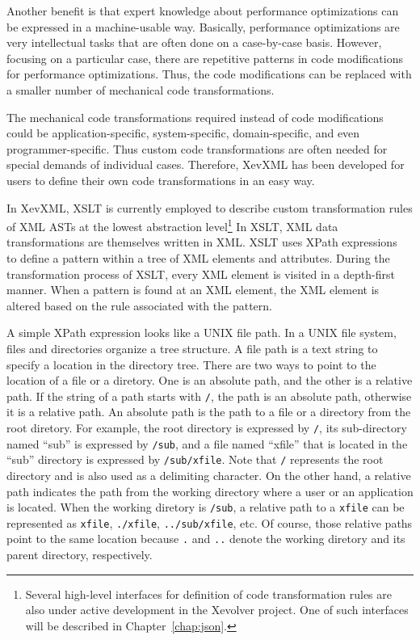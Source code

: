 Another benefit is that expert knowledge about performance optimizations
can be expressed in a machine-usable way.  Basically, performance
optimizations are very intellectual tasks that are often done on a
case-by-case basis.  However, focusing on a particular case, there are
repetitive patterns in code modifications for performance
optimizations. Thus, the code modifications can be replaced with a
smaller number of mechanical code transformations.

The mechanical code transformations required instead of code
modifications could be application-specific, system-specific,
domain-specific, and even programmer-specific. Thus custom code
transformations are often needed for special demands of individual
cases.  Therefore, XevXML has been developed for users to define their
own code transformations in an easy way.

In XevXML, XSLT is currently employed to describe custom transformation
rules of XML ASTs at the lowest abstraction level\footnote{Several
high-level interfaces for definition of code transformation rules are
also under active development in the Xevolver project.  One of such
interfaces will be described in Chapter~\ref{chap:json}.}  In XSLT, XML
data transformations are themselves written in XML.  XSLT uses XPath
expressions~\cite{xpath} to define a pattern within a tree of XML
elements and attributes.  During the transformation process of XSLT,
every XML element is visited in a depth-first manner.  When a pattern is
found at an XML element, the XML element is altered based on the rule
associated with the pattern.

A simple XPath expression looks like a UNIX file path. In a UNIX file
system, files and directories organize a tree structure. A file path is
a text string to specify a location in the directory tree.  There are
two ways to point to the location of a file or a diretory.  One is an
absolute path, and the other is a relative path.  If the string of a
path starts with \texttt{/}, the path is an absolute path, otherwise it
is a relative path. An absolute path is the path to a file or a
directory from the root diretory. For example, the root directory is
expressed by \texttt{/}, its sub-directory named ``sub'' is expressed by
\texttt{/sub}, and a file named ``xfile'' that is located in the ``sub''
directory is expressed by \texttt{/sub/xfile}.  Note that \texttt{/}
represents the root directory and is also used as a delimiting
character.  On the other hand, a relative path indicates the path from
the working directory where a user or an application is located. When
the working diretory is \texttt{/sub}, a relative path to a
\texttt{xfile} can be represented as \texttt{xfile}, \texttt{./xfile},
\texttt{../sub/xfile}, etc.  Of course, those relative paths point to
the same location because \texttt{.} and \texttt{..} denote the working
diretory and its parent directory, respectively.

